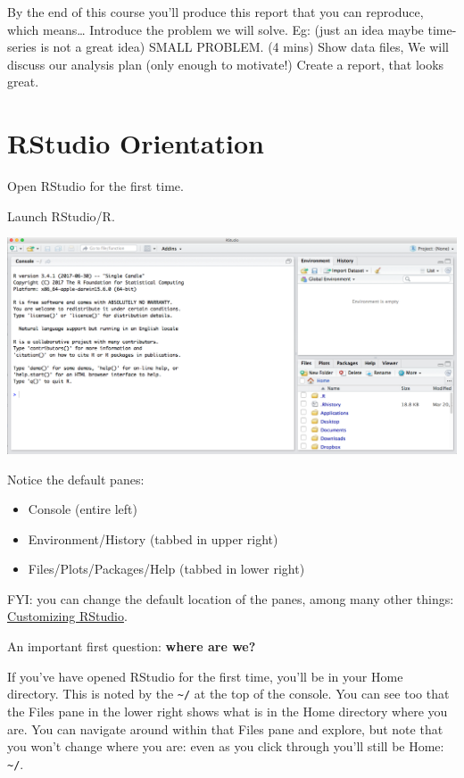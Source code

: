 \documentclass[]{book}
\providecommand{\tightlist}{%
  \setlength{\itemsep}{0pt}\setlength{\parskip}{0pt}}
\begin{document}
By the end of this course you'll produce this report that you can reproduce, which means\ldots{}
Introduce the problem we will solve. Eg: (just an idea maybe time-series is not a great idea) SMALL PROBLEM. (4 mins)
Show data files, We will discuss our analysis plan (only enough to motivate!) Create a report, that looks great.

\hypertarget{rstudio-orientation}{%
\section{RStudio Orientation}\label{rstudio-orientation}}

Open RStudio for the first time.

Launch RStudio/R.

\includegraphics{img/RStudio_IDE.png}

Notice the default panes:

\begin{itemize}
\tightlist
\item
  Console (entire left)
\item
  Environment/History (tabbed in upper right)
\item
  Files/Plots/Packages/Help (tabbed in lower right)
\end{itemize}

FYI: you can change the default location of the panes, among many other things: \href{https://support.rstudio.com/hc/en-us/articles/200549016-Customizing-RStudio}{Customizing RStudio}.

An important first question: \textbf{where are we?}

If you've have opened RStudio for the first time, you'll be in your Home directory. This is noted by the \texttt{\textasciitilde{}/} at the top of the console. You can see too that the Files pane in the lower right shows what is in the Home directory where you are. You can navigate around within that Files pane and explore, but note that you won't change where you are: even as you click through you'll still be Home: \texttt{\textasciitilde{}/}.
\end{document}

